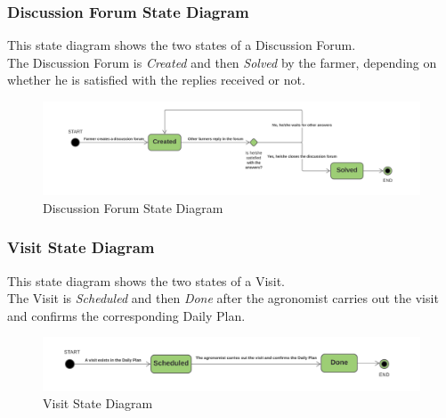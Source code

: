 \subsubsection{Discussion Forum State Diagram}
This state diagram shows the two states of a Discussion Forum.\\
The Discussion Forum is \textit{Created} and then \textit{Solved} by the farmer, depending on whether he is satisfied with the replies received or not.
\begin{figure}[h!]
  \includegraphics[width=\textwidth,height=\textheight,keepaspectratio]{./Images/State Chart DiscussionForum.png}
  \caption{Discussion Forum State Diagram}
\end{figure}

\subsubsection{Visit State Diagram}
This state diagram shows the two states of a Visit.\\
The Visit is \textit{Scheduled} and then \textit{Done} after the agronomist carries out the visit and confirms the corresponding Daily Plan.
\begin{figure}[h!]
  \includegraphics[width=\textwidth,height=\textheight,keepaspectratio]{./Images/State Chart Visit.png}
  \caption{Visit State Diagram}
\end{figure}
